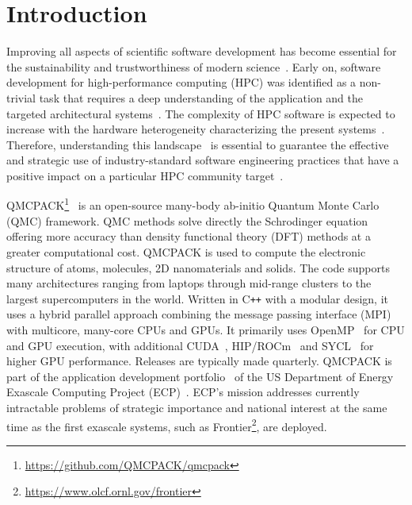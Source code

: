 

\section{Introduction}

Improving all aspects of scientific software development has become essential for the sustainability and trustworthiness of modern science~\cite{osti_1846008}. Early on, software
development for high-performance computing (HPC) was identified as a non-trivial task that requires a deep understanding of the
application and the targeted architectural systems~\cite{parashar1994study}. The complexity of HPC software is expected to increase
with the hardware heterogeneity characterizing the present systems~\cite{osti_1473756}. Therefore, understanding this
landscape~\cite{grannan2020understanding} is essential to guarantee the effective and strategic use of industry-standard software engineering
practices that have a positive impact on a particular HPC community target~\cite{basili2008understanding}. 

QMCPACK\footnote{\url{https://github.com/QMCPACK/qmcpack}}~\cite{kim2018qmcpack,doi:10.1063/5.0004860} is an open-source many-body
ab-initio Quantum Monte Carlo~\cite{foulkes2001} (QMC) framework. QMC methods solve directly the Schrodinger equation offering more accuracy than density functional theory (DFT) methods at a greater computational cost. QMCPACK is used to compute the electronic structure of atoms, molecules, 2D nanomaterials and solids.
The code supports many architectures ranging from laptops through mid-range clusters to the largest supercomputers in the world. Written in C\texttt{++} with a modular design, it uses a hybrid parallel approach combining the message passing interface (MPI) with multicore, many-core CPUs and GPUs. It primarily uses OpenMP~\cite{chapman2008using} for CPU and GPU execution, with additional CUDA~\cite{nickolls2008scalable},
HIP/ROCm~\cite{hip} and SYCL~\cite{reyes2016sycl} for higher GPU performance. Releases are typically made quarterly. QMCPACK is part of the application development portfolio~\cite{osti_1594850} of the US Department of Energy Exascale Computing Project (ECP)~\cite{8528398}. ECP's mission 
addresses currently intractable problems of strategic importance and national interest at the same time as the first exascale systems, such as Frontier\footnote{\url{https://www.olcf.ornl.gov/frontier}}, are deployed.

